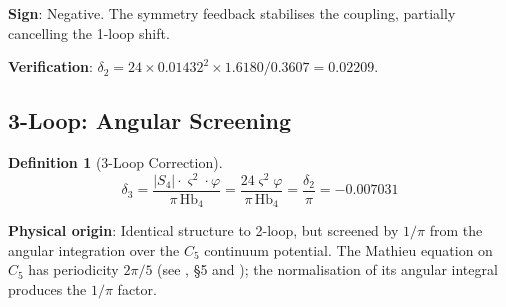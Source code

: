 \documentclass[11pt,a4paper]{article}
\theoremstyle{definition}
\newtheorem{definition}[theorem]{Definition}
\newcommand{\Hbfour}{\mathrm{Hb}_4}
\newcommand{\gs}{\varsigma}
\begin{document}
\textbf{Sign}: Negative. The symmetry feedback stabilises the coupling, partially cancelling the 1-loop shift.

\textbf{Verification}: $\delta_2 = 24 \times 0.01432^2 \times 1.6180 / 0.3607 = 0.02209$.

\subsection{3-Loop: Angular Screening}

\begin{definition}[3-Loop Correction]
\begin{equation}
\delta_3 = \frac{|S_4| \cdot \gs^2 \cdot \varphi}{\pi \, \Hbfour} = \frac{24\gs^2\varphi}{\pi\,\Hbfour} = \frac{\delta_2}{\pi} = -0.007031
\label{eq:loop3}
\end{equation}
\end{definition}

\textbf{Physical origin}: Identical structure to 2-loop, but screened by $1/\pi$ from the angular integration over the $C_5$ continuum potential. The Mathieu equation on $C_5$ has periodicity $2\pi/5$ (see \cite{Hubka2026QSD}, \S5 and \cite{Hubka2026QSDsupp}); the normalisation of its angular integral produces the $1/\pi$ factor.
\end{document}
